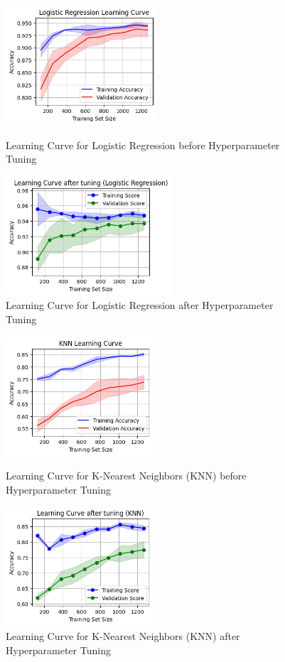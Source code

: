 \documentclass[12pt]{report}
\begin{document}
\begin{figure}[H]
	\centering
	\begin{minipage}{0.45\textwidth}
			\centering
			\includegraphics[height=12em]{lc_LR.png}
			\caption{Learning Curve for Logistic Regression before Hyperparameter Tuning}
			\label{lc_LR}
	\end{minipage}
	\hfill
	\begin{minipage}{0.45\textwidth}
			\centering
			\includegraphics[height=12em]{lc_tuned_LR.png}
			\caption{Learning Curve for Logistic Regression after Hyperparameter Tuning}
			\label{lc_tuned_LR}
	\end{minipage}
\end{figure}

\begin{figure}[H]
	\centering
	\begin{minipage}{0.45\textwidth}
			\centering
			\includegraphics[height=12em]{lc_KNN.png}
			\caption{Learning Curve for K-Nearest Neighbors (KNN) before Hyperparameter Tuning}
			\label{lc_KNN}
	\end{minipage}
	\hfill
	\begin{minipage}{0.45\textwidth}
			\centering
			\includegraphics[height=12em]{lc_tuned_KNN.png}
			\caption{Learning Curve for K-Nearest Neighbors (KNN) after Hyperparameter Tuning}
			\label{lc_tuned_KNN}
	\end{minipage}
\end{figure}
\end{document}
